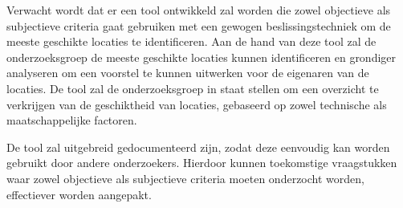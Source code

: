Verwacht wordt dat er een tool ontwikkeld zal worden die zowel objectieve als subjectieve criteria gaat gebruiken met een gewogen beslissingstechniek om de meeste geschikte locaties te identificeren. Aan de hand van deze tool zal de onderzoeksgroep de meeste geschikte locaties kunnen identificeren en grondiger analyseren om een voorstel te kunnen uitwerken voor de eigenaren van de locaties. De tool zal de onderzoeksgroep in staat stellen om een overzicht te verkrijgen van de geschiktheid van locaties, gebaseerd op zowel technische als maatschappelijke factoren.

De tool zal uitgebreid gedocumenteerd zijn, zodat deze eenvoudig kan worden gebruikt door andere onderzoekers. Hierdoor kunnen toekomstige vraagstukken waar zowel objectieve als subjectieve criteria moeten onderzocht worden, effectiever worden aangepakt.
